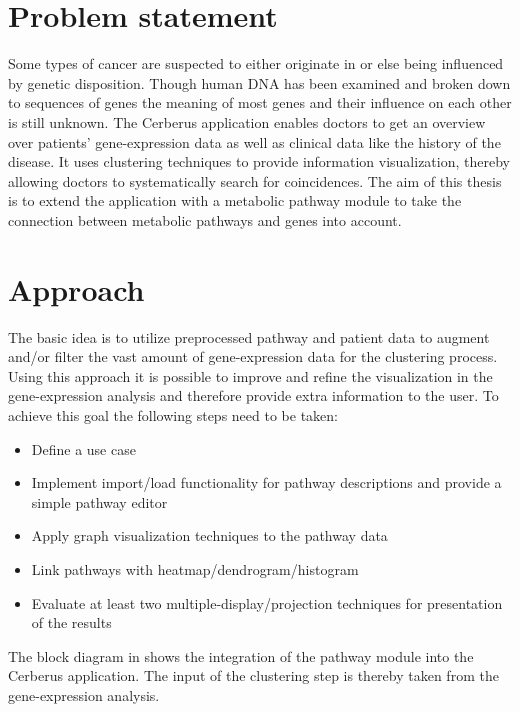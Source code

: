 \chapter{Problem statement}
Some types of cancer are suspected to either originate in or else being influenced by genetic disposition. Though human DNA has been examined and broken down to sequences of genes the meaning of most genes and their influence on each other is still unknown. The Cerberus application enables doctors to get an overview over patients' gene-expression data as well as clinical data like the history of the disease. It uses clustering techniques to provide information visualization, thereby allowing doctors to systematically search for coincidences. The aim of this thesis is to extend the application with a metabolic pathway module to take the connection between metabolic pathways and genes into account. 

\chapter{Approach}

The basic idea is to utilize preprocessed pathway and patient data to augment and/or filter the vast amount of gene-expression data for the clustering process. Using this approach it is possible to improve and refine the visualization in the gene-expression analysis and therefore provide extra information to the user. To achieve this goal the following steps need to be taken:
\begin{itemize}
\item Define a use case
\item Implement import/load functionality for pathway descriptions and provide a simple pathway editor
\item Apply graph visualization techniques to the pathway data
\item Link pathways with heatmap/dendrogram/histogram
\item Evaluate at least two multiple-display/projection techniques for presentation of the results
\end{itemize}

The block diagram in  shows the integration of the pathway module into the Cerberus application. The input of the clustering step is thereby taken from the gene-expression analysis.

